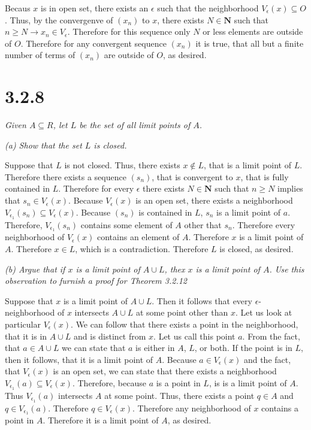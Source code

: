 \documentclass[11pt,oneside,titlepage]{book}
\begin{document}
Becaus $x$ is in open set, there exists an $\epsilon$ such that the neighborhood $V_\epsilon (x) \subseteq O$. Thus, by the convergenve of $(x_n)$ to $x$,
there
exists $N \in \textbf{N}$ such that $n \geq N \to x_n \in V_\epsilon$.
Therefore for this sequence only $N$ or less elements are outside of $O$.
Therefore for any convergent sequence $(x_n)$ it is true, that all but a finite
number of terms of $(x_n)$ are outside of $O$, as desired.

\section*{3.2.8}
\textit{Given $A \subseteq R$, let $L$ be the set of all limit points of
  $A$.}

\textit{(a) Show that the set $L$ is closed.}

Suppose that $L$ is not closed. Thus, there exists $x \notin L$, that is a
limit point of $L$. Therefore there exists a sequence $(s_n)$, that is
convergent to $x$, that is fully contained in $L$. Therefore for
every $\epsilon$ there exists $N \in \textbf{N}$ such that $n \geq N$ implies
that $s_n \in  V_\epsilon(x)$. Because $V_\epsilon(x)$ is an open set, there
exists a neighborhood $V_{\epsilon_1}(s_n) \subseteq V_\epsilon(x)$.
Because $(s_n)$ is contained in $L$, $s_n$ is a limit point of $a$. Therefore,
$V_{\epsilon_1}(s_n)$ contains some element of $A$ other that $s_n$.
Therefore every neighborhood of $V_\epsilon(x)$ contains an element of $A$.
Therefore $x$ is a limit point of $A$. Therefore $x \in L$, which is a
contradiction. Therefore $L$ is closed, as desired.

\textit{(b) Argue that if $x$ is a limit point of $A \cup L$, thex $x$ is a
  limit point of $A$. Use this observation to furnish a proof for
  Theorem 3.2.12}

Suppose that $x$ is a limit point of $A \cup L$. Then it follows that every
$\epsilon$-neighborhood of $x$ intersects $A \cup L$ at some point other than $x$. Let us look at particular  $V_\epsilon(x)$.
We can follow that there exists a point in the neighborhood,
that it is in $A \cup L$ and  is distinct from $x$. Let us call this point  $a$.
From the fact, that $a \in A \cup L$ we can state that $a$ is either in $A$,
$L$, or both.
If the point is in $L$, then it follows, that it is a limit point of $A$.
Because $a \in V_\epsilon(x)$ and the fact, that $V_\epsilon(x)$ is an open set,
we can state that there exists a neighborhood
$V_{\epsilon_1}(a) \subseteq V_\epsilon(x)$. Therefore, because $a$ is a point
in $L$, is is a limit point of $A$. Thus $V_{\epsilon_1}(a)$ intersects $A$ at
some point. Thus, there exists a point $q \in A$ and $q \in V_{\epsilon_1}(a)$.
Therefore $q \in V_\epsilon(x)$. Therefore any neighborhood of $x$ contains a
point in $A$. Therefore it is a limit point of $A$, as desired.
\end{document}
